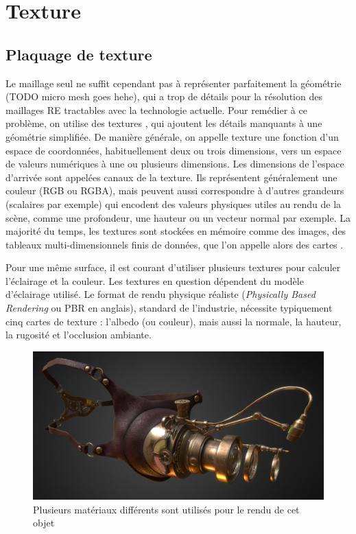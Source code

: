 \section{Texture}

\subsection*{Plaquage de texture}

Le maillage seul ne suffit cependant pas à représenter parfaitement la géométrie (TODO micro mesh goes hehe), qui a trop de détails pour la résolution des maillages RE tractables avec la technologie actuelle. Pour remédier à ce problème, on utilise des \og textures \fg, qui ajoutent les détails manquants à une géométrie simplifiée. De manière générale, on appelle texture une fonction d'un espace de coordonnées, habituellement deux ou trois dimensions, vers un espace de valeurs numériques à une ou plusieurs dimensions. Les dimensions de l'espace d'arrivée sont appelées \og canaux \fg de la texture. Ils représentent généralement une couleur (RGB ou RGBA), mais peuvent aussi correspondre à d'autres grandeurs (scalaires par exemple) qui encodent des valeurs physiques utiles au rendu de la scène, comme une profondeur, une hauteur ou un vecteur normal par exemple. La majorité du temps, les textures sont stockées en mémoire comme des images, des tableaux multi-dimensionnels finis de données, que l'on appelle alors des \og cartes \fg.

\bigskip

Pour une même surface, il est courant d'utiliser plusieurs textures pour calculer l'éclairage et la couleur. Les textures en question dépendent du modèle d'éclairage utilisé. Le format de rendu physique réaliste ({\it Physically Based Rendering} ou PBR en anglais), standard de l'industrie, nécessite typiquement cinq cartes de texture : l'albedo (ou couleur), mais aussi la normale, la hauteur, la rugosité et l'occlusion ambiante.

\bigskip

\begin{figure}
    \centering
    \includegraphics[width=.65\textwidth]{contenu/resources/images/mutli-material-object}
    \caption[Rendu d'un objet comportant plusieurs matériaux]{Plusieurs matériaux différents sont utilisés pour le rendu de cet objet~\cite{multi-material}}
    \label{fig:multi-material}
\end{figure}

